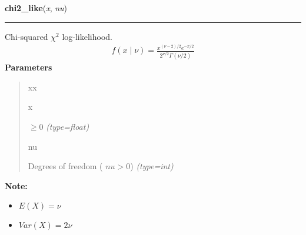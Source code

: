 \hspace{.8\funcindent}\begin{boxedminipage}{\funcwidth}

    \raggedright \textbf{chi2\_like}(\textit{x}, \textit{nu})

    \vspace{-1.5ex}

    \rule{\textwidth}{0.5\fboxrule}
\setlength{\parskip}{2ex}

Chi-squared $\chi^2$ log-likelihood.
\begin{equation*}\begin{split}f(x \mid \nu) = \frac{x^{(\nu-2)/2}e^{-x/2}}{2^{\nu/2}\Gamma(\nu/2)}\end{split}\end{equation*}\setlength{\parskip}{1ex}
      \textbf{Parameters}
      \vspace{-1ex}

      \begin{quote}
        \begin{Ventry}{xx}

          \item[x]


$\ge 0$
            {\it (type=float)}

          \item[nu]


Degrees of freedom ( $nu > 0$)
            {\it (type=int)}

        \end{Ventry}

      \end{quote}

\textbf{Note:} \begin{itemize}
\item {} 
$E(X)=\nu$

\item {} 
$Var(X)=2\nu$

\end{itemize}


    \end{boxedminipage}

    \label{pymc:distributions:dirichlet_like}

    \vspace{0.5ex}

